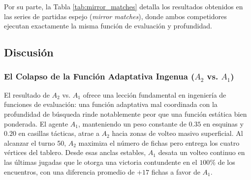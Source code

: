 \documentclass[10pt,a4paper]{article}
\begin{document}
Por su parte, la Tabla \ref{tab:mirror_matches} detalla los resultados obtenidos en las series de partidas espejo (\textit{mirror matches}), donde ambos competidores ejecutan exactamente la misma función de evaluación y profundidad.

\begin{table}[h]
    \centering
    \caption{Resultados de enfrentamientos simétricos (\textit{Mirror Matches}, 100 partidas)}
    \label{tab:mirror_matches}
\end{table}

\subsection{Discusión}

\subsubsection{El Colapso de la Función Adaptativa Ingenua \texorpdfstring{($A_2$ vs. $A_1$)}{(A2 vs. A1)}}
El resultado de $A_2$ vs. $A_1$ ofrece una lección fundamental en ingeniería de funciones de evaluación: una función adaptativa mal coordinada con la profundidad de búsqueda rinde notablemente peor que una función estática bien ponderada. El agente $A_1$, manteniendo un peso constante de $0.35$ en esquinas y $0.20$ en casillas tácticas, atrae a $A_2$ hacia zonas de volteo masivo superficial. Al alcanzar el turno 50, $A_2$ maximiza el número de fichas pero entrega los cuatro vértices del tablero. Desde esas anclas estables, $A_1$ desata un volteo continuo en las últimas jugadas que le otorga una victoria contundente en el $100\%$ de los encuentros, con una diferencia promedio de $+17$ fichas a favor de $A_1$.
\end{document}

